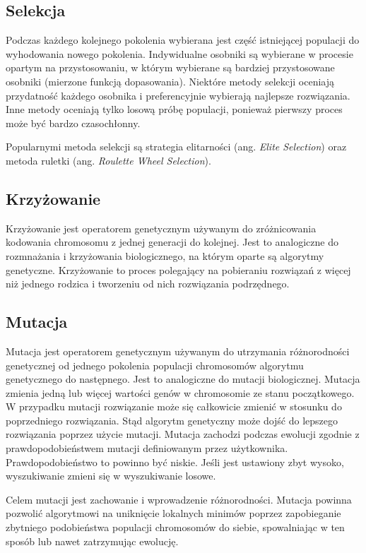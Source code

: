 \documentclass{classrep}
\begin{document}
\subsection{Selekcja}
Podczas każdego kolejnego pokolenia wybierana jest część istniejącej populacji do wyhodowania nowego pokolenia. Indywidualne osobniki są wybierane w procesie opartym na przystosowaniu, w którym wybierane są bardziej przystosowane osobniki (mierzone funkcją dopasowania). Niektóre metody selekcji oceniają przydatność każdego osobnika i preferencyjnie wybierają najlepsze rozwiązania. Inne metody oceniają tylko losową próbę populacji, ponieważ pierwszy proces może być bardzo czasochłonny. 

Popularnymi metoda selekcji są strategia elitarności (ang. \textit{Elite Selection}) oraz metoda ruletki (ang. \textit{Roulette Wheel Selection}). \cite{selection}

\subsection{Krzyżowanie}
Krzyżowanie jest operatorem genetycznym używanym do zróżnicowania kodowania chromosomu z jednej generacji do kolejnej. Jest to analogiczne do rozmnażania i krzyżowania biologicznego, na którym oparte są algorytmy genetyczne. Krzyżowanie to proces polegający na pobieraniu rozwiązań z więcej niż jednego rodzica i tworzeniu od nich rozwiązania podrzędnego.

\subsection{Mutacja}
Mutacja jest operatorem genetycznym używanym do utrzymania różnorodności genetycznej od jednego pokolenia populacji chromosomów algorytmu genetycznego do następnego. Jest to analogiczne do mutacji biologicznej. Mutacja zmienia jedną lub więcej wartości genów w chromosomie ze stanu początkowego. W przypadku mutacji rozwiązanie może się całkowicie zmienić w stosunku do poprzedniego rozwiązania. Stąd algorytm genetyczny może dojść do lepszego rozwiązania poprzez użycie mutacji. Mutacja zachodzi podczas ewolucji zgodnie z prawdopodobieństwem mutacji definiowanym przez użytkownika. Prawdopodobieństwo to powinno być niskie. Jeśli jest ustawiony zbyt wysoko, wyszukiwanie zmieni się w wyszukiwanie losowe. 

Celem mutacji jest zachowanie i wprowadzenie różnorodności. Mutacja powinna pozwolić algorytmowi na uniknięcie lokalnych minimów poprzez zapobieganie zbytniego podobieństwa populacji chromosomów do siebie, spowalniając w ten sposób lub nawet zatrzymując ewolucję. \cite{mutation}
\end{document}
